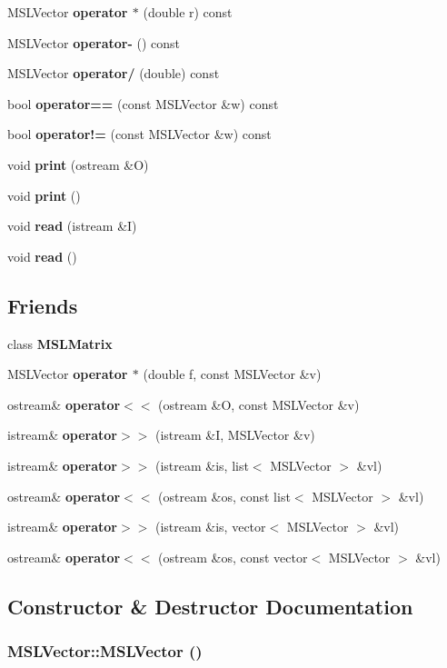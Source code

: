 \begin{CompactItemize}
\item 
MSLVector {\bf operator $\ast$} (double r) const
\item 
MSLVector {\bf operator-} () const
\item 
MSLVector {\bf operator/} (double) const
\item 
bool {\bf operator==} (const MSLVector \&w) const
\item 
bool {\bf operator!=} (const MSLVector \&w) const
\item 
void {\bf print} (ostream \&O)
\item 
void {\bf print} ()
\item 
void {\bf read} (istream \&I)
\item 
void {\bf read} ()
\end{CompactItemize}
\subsection*{Friends}
\begin{CompactItemize}
\item 
class {\bf MSLMatrix}
\item 
MSLVector {\bf operator $\ast$} (double f, const MSLVector \&v)
\item 
ostream\& {\bf operator$<$$<$} (ostream \&O, const MSLVector \&v)
\item 
istream\& {\bf operator$>$$>$} (istream \&I, MSLVector \&v)
\item 
istream\& {\bf operator$>$$>$} (istream \&is, list$<$ MSLVector $>$ \&vl)
\item 
ostream\& {\bf operator$<$$<$} (ostream \&os, const list$<$ MSLVector $>$ \&vl)
\item 
istream\& {\bf operator$>$$>$} (istream \&is, vector$<$ MSLVector $>$ \&vl)
\item 
ostream\& {\bf operator$<$$<$} (ostream \&os, const vector$<$ MSLVector $>$ \&vl)
\end{CompactItemize}


\subsection{Constructor \& Destructor Documentation}
\subsubsection{\setlength{\rightskip}{0pt plus 5cm}MSLVector::MSLVector ()}\label{class_MSLVector_a0}


